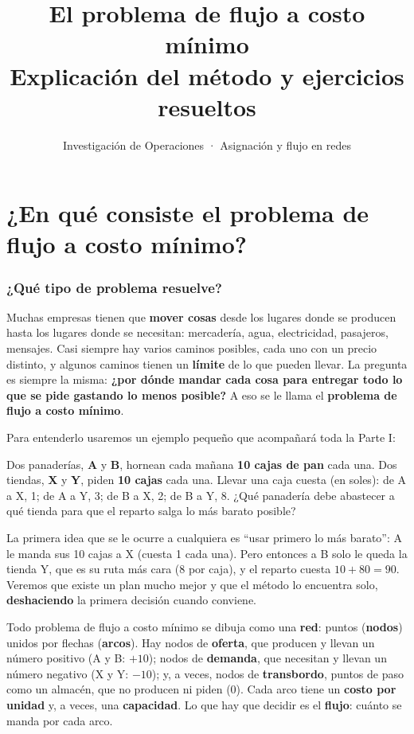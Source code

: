\documentclass[11pt,a4paper]{article}
\title{\textbf{El problema de flujo a costo mínimo}\\[4pt]\large Explicación del método y ejercicios resueltos}
\author{Investigación de Operaciones · Asignación y flujo en redes}
\date{}
\begin{document}
\maketitle
\tableofcontents
\newpage


\part{¿En qué consiste el problema de flujo a costo mínimo?}

\section{¿Qué tipo de problema resuelve?}

Muchas empresas tienen que \textbf{mover cosas} desde los lugares donde se producen hasta los lugares donde se
necesitan: mercadería, agua, electricidad, pasajeros, mensajes. Casi siempre hay varios caminos posibles, cada
uno con un precio distinto, y algunos caminos tienen un \textbf{límite} de lo que pueden llevar. La pregunta es
siempre la misma: \textbf{¿por dónde mandar cada cosa para entregar todo lo que se pide gastando lo menos posible?}
A eso se le llama el \textbf{problema de flujo a costo mínimo}.

Para entenderlo usaremos un ejemplo pequeño que acompañará toda la Parte I:

\begin{ojo}
Dos panaderías, \textbf{A} y \textbf{B}, hornean cada mañana \textbf{10 cajas de pan} cada una. Dos tiendas,
\textbf{X} y \textbf{Y}, piden \textbf{10 cajas} cada una. Llevar una caja cuesta (en soles):
de A a X, 1; de A a Y, 3; de B a X, 2; de B a Y, 8. ¿Qué panadería debe abastecer a qué tienda para que el
reparto salga lo más barato posible?
\end{ojo}

La primera idea que se le ocurre a cualquiera es ``usar primero lo más barato'': A le manda sus 10 cajas a X
(cuesta 1 cada una). Pero entonces a B solo le queda la tienda Y, que es su ruta más cara (8 por caja), y el
reparto cuesta $10 + 80 = 90$. Veremos que existe un plan mucho mejor y que el método lo encuentra solo,
\textbf{deshaciendo} la primera decisión cuando conviene.

Todo problema de flujo a costo mínimo se dibuja como una \textbf{red}: puntos (\textbf{nodos}) unidos por flechas
(\textbf{arcos}). Hay nodos de \textbf{oferta}, que producen y llevan un número positivo (A y B: $+10$); nodos de
\textbf{demanda}, que necesitan y llevan un número negativo (X y Y: $-10$); y, a veces, nodos de \textbf{transbordo},
puntos de paso como un almacén, que no producen ni piden (0). Cada arco tiene un \textbf{costo por unidad} y, a veces,
una \textbf{capacidad}. Lo que hay que decidir es el \textbf{flujo}: cuánto se manda por cada arco.
\end{document}
